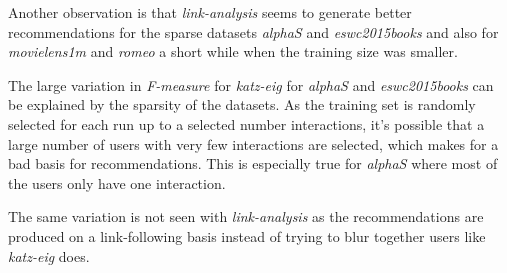 Another observation is that \textit{link-analysis} seems to generate better recommendations for the sparse datasets \textit{alphaS} and \textit{eswc2015books} and also for \textit{movielens1m} and \textit{romeo} a short while when the training size was smaller.

The large variation in \textit{F-measure} for \textit{katz-eig} for \textit{alphaS} and \textit{eswc2015books} can be explained by the sparsity of the datasets. As the training set is randomly selected for each run up to a selected number interactions, it's possible that a large number of users with very few interactions are selected, which makes for a bad basis for recommendations. This is especially true for \textit{alphaS} where most of the users only have one interaction.

The same variation is not seen with \textit{link-analysis} as the recommendations are produced on a link-following basis instead of trying to blur together users like \textit{katz-eig} does.

\FloatBarrier

